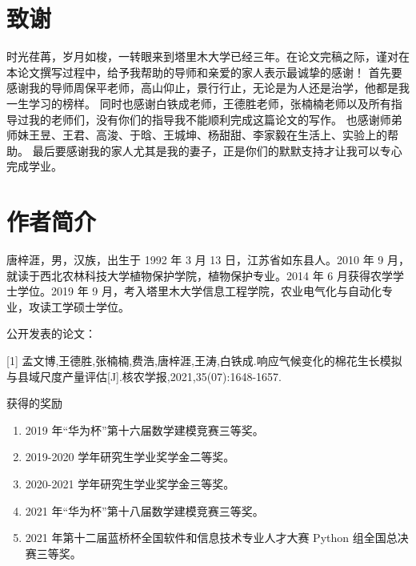 \documentclass[a4paper,oneside,zihao=5,AutoFakeBold,fontset=windows]{ctexbook}
\begin{document}
\pagestyle{empty}
\frontmatter

%


\tableofcontents
\newpage
\mainmatter
\pagestyle{fancy}
\setcounter{page}{1}
\begin{spacing}{}
  
  
  
  
  
  
  \backmatter
  \printbibliography
  \chapter*{致谢}

  时光荏苒，岁月如梭，一转眼来到塔里木大学已经三年。在论文完稿之际，谨对在本论文撰写过程中，给予我帮助的导师和亲爱的家人表示最诚挚的感谢！%
  首先要感谢我的导师周保平老师，高山仰止，景行行止，无论是为人还是治学，他都是我一生学习的榜样。%
  同时也感谢白铁成老师，王德胜老师，张楠楠老师以及所有指导过我的老师们，没有你们的指导我不能顺利完成这篇论文的写作。%
  也感谢师弟师妹王昱、王君、高浚、于晗、王城坤、杨甜甜、李家毅在生活上、实验上的帮助。%
  最后要感谢我的家人尤其是我的妻子，正是你们的默默支持才让我可以专心完成学业。

  \chapter*{作者简介}
  唐梓涯，男，汉族，出生于 1992 年 3 月 13 日，江苏省如东县人。2010 年 9 月，就读于西北农林科技大学植物保护学院，植物保护专业。2014 年 6 月获得农学学士学位。2019 年 9 月，考入塔里木大学信息工程学院，农业电气化与自动化专业，攻读工学硕士学位。

  公开发表的论文：

  [1] 孟文博,王德胜,张楠楠,费浩,唐梓涯,王涛,白铁成.响应气候变化的棉花生长模拟与县域尺度产量评估[J].核农学报,2021,35(07):1648-1657.

  获得的奖励
  \begin{enumerate}
    \item 2019 年“华为杯”第十六届数学建模竞赛三等奖。
    \item 2019{-}2020 学年研究生学业奖学金二等奖。
    \item 2020{-}2021 学年研究生学业奖学金三等奖。
    \item 2021 年“华为杯”第十八届数学建模竞赛三等奖。
    \item 2021 年第十二届蓝桥杯全国软件和信息技术专业人才大赛 Python 组全国总决赛三等奖。
  \end{enumerate}
\end{spacing}
\end{document}
